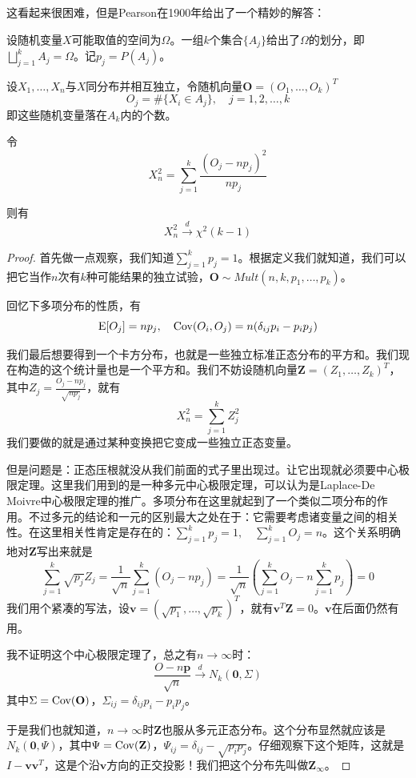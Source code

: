 这看起来很困难，但是Pearson在1900年给出了一个精妙的解答：
\begin{theorem}[Pearson定理]
设随机变量$X$可能取值的空间为$\Omega$。一组$k$个集合$\{A_j\}$给出了$\Omega$的划分，即$\bigsqcup_{j=1}^kA_j=\Omega$。记$p_j=P(A_j)$。

设$X_1,\ldots,X_n$与$X$同分布并相互独立，令随机向量$\mathbf{O}=(O_1,\ldots,O_k)^T$
\[
O_j=\#\{X_i\in A_j\},\quad j=1,2,\ldots,k
\]
即这些随机变量落在$A_k$内的个数。

令
\[
X_n^2=\sum_{j=1}^k \frac{(O_j-np_j)^2}{np_j}
\]

则有
\[
X_n^2 \xrightarrow{d} \chi^2(k-1)
\]
\end{theorem}
\begin{proof}
首先做一点观察，我们知道$\sum_{j=1}^k p_j =1$。根据定义我们就知道，我们可以把它当作$n$次有$k$种可能结果的独立试验，$\mathbf{O}\sim Mult(n,k,p_1,\ldots,p_k)$。

回忆下多项分布的性质，有
\[
\operatorname{E}[O_j]=np_j,\quad \operatorname{Cov}(O_i,O_j)=n(\delta_{ij}p_i-p_ip_j)
\]

我们最后想要得到一个卡方分布，也就是一些独立标准正态分布的平方和。我们现在构造的这个统计量也是一个平方和。我们不妨设随机向量$\mathbf{Z}=(Z_1,\ldots,Z_k)^T$，其中$Z_j=\frac{O_j-np_j}{\sqrt{np_j}}$，就有
\[
X_n^2 = \sum_{j=1}^k Z_j^2
\]
我们要做的就是通过某种变换把它变成一些独立正态变量。

但是问题是：正态压根就没从我们前面的式子里出现过。让它出现就必须要中心极限定理。这里我们用到的是一种多元中心极限定理，可以认为是Laplace-De Moivre中心极限定理的推广。多项分布在这里就起到了一个类似二项分布的作用。不过多元的结论和一元的区别最大之处在于：它需要考虑诸变量之间的相关性。在这里相关性肯定是存在的：$\sum_{j=1}^kp_j=1,\quad \sum_{j=1}^k O_j=n$。这个关系明确地对$\mathbf{Z}$写出来就是
\[
\sum_{j=1}^k\sqrt{p_j}Z_j=\frac{1}{\sqrt{n}}\sum_{j=1}^k(O_j-np_j) =  \frac{1}{\sqrt{n}}(\sum_{j=1}^kO_j-n\sum_{j=1}^kp_j) = 0
\]
我们用个紧凑的写法，设$\mathbf{v}=(\sqrt{p_1},\ldots,\sqrt{p_k})^T$，就有$\mathbf{v}^T\mathbf{Z}=0$。$\mathbf{v}$在后面仍然有用。

我不证明这个中心极限定理了，总之有$n\to \infty$时：
\[
\frac{O-n\mathbf{p}}{\sqrt{n}} \xrightarrow{d} N_k(\mathbf{0},\Sigma)
\]
其中$\Sigma=\operatorname{Cov}(\mathbf{O})$，$\Sigma_{ij}=\delta_{ij}p_i-p_ip_j$。

于是我们也就知道，$n\to \infty$时$\mathbf{Z}$也服从多元正态分布。这个分布显然就应该是$N_k(\mathbf{0}, \Psi)$，其中$\Psi=\operatorname{Cov}(\mathbf{Z})$，$\Psi_{ij}=\delta_{ij}-\sqrt{p_ip_j}$。仔细观察下这个矩阵，这就是$I-\mathbf{v}\mathbf{v}^T$，这是个沿$\mathbf{v}$方向的正交投影！我们把这个分布先叫做$\mathbf{Z}_\infty$。


\end{proof}
